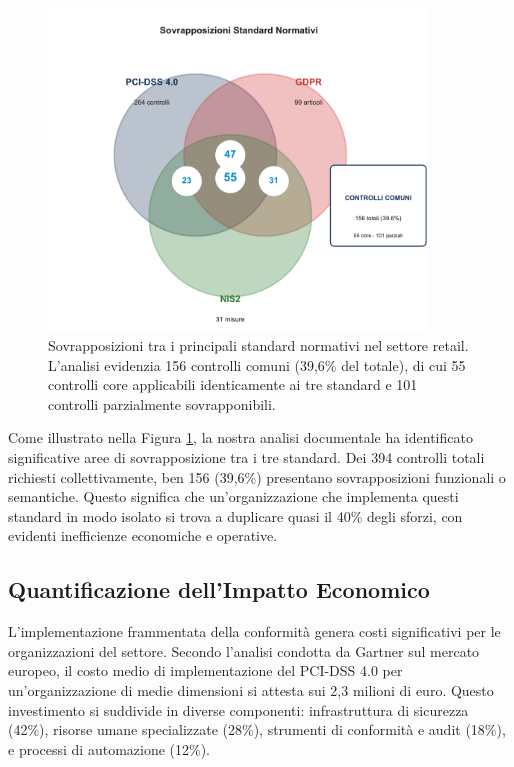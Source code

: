 \begin{figure}[h]
\centering
\includegraphics[width=0.9\textwidth]{thesis_figures/cap4/figura_4_1_venn_LARGE.pdf}
\caption{Sovrapposizioni tra i principali standard normativi nel settore retail. L'analisi evidenzia 156 controlli comuni (39,6\% del totale), di cui 55 controlli core applicabili identicamente ai tre standard e 101 controlli parzialmente sovrapponibili.}
\label{fig:venn_overlap}
\end{figure}

Come illustrato nella Figura \ref{fig:venn_overlap}, la nostra analisi documentale ha identificato significative aree di sovrapposizione tra i tre standard. Dei 394 controlli totali richiesti collettivamente, ben 156 (39,6\%) presentano sovrapposizioni funzionali o semantiche. Questo significa che un'organizzazione che implementa questi standard in modo isolato si trova a duplicare quasi il 40\% degli sforzi, con evidenti inefficienze economiche e operative.

\subsection{Quantificazione dell'Impatto Economico}
\label{subsec:4.2.2_impatto}

L'implementazione frammentata della conformità genera costi significativi per le organizzazioni del settore. Secondo l'analisi condotta da Gartner sul mercato europeo, il costo medio di implementazione del PCI-DSS 4.0 per un'organizzazione di medie dimensioni si attesta sui 2,3 milioni di euro\autocite{Gartner2024gdpr}. Questo investimento si suddivide in diverse componenti: infrastruttura di sicurezza (42\%), risorse umane specializzate (28\%), strumenti di conformità e audit (18\%), e processi di automazione (12\%).

